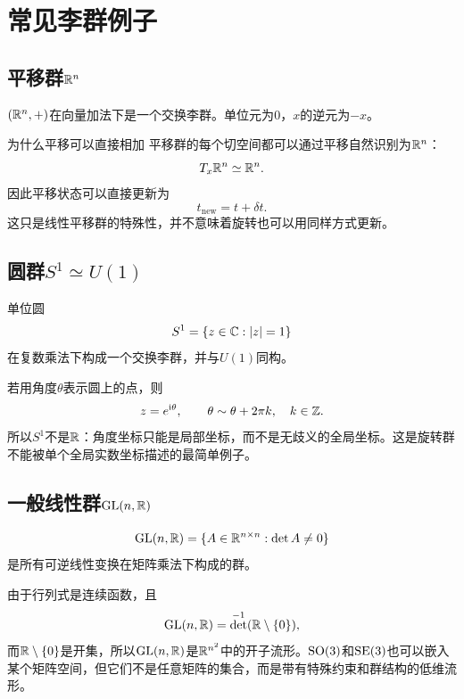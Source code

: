 
\section{常见李群例子}

\subsection{平移群$\mathbb{R}^n$}

\begin{definition}[平移李群]
$(\mathbb{R}^n,+)$在向量加法下是一个交换李群。单位元为$0$，$x$的逆元为$-x$。
\end{definition}

\begin{lieexample}{为什么平移可以直接相加}
平移群的每个切空间都可以通过平移自然识别为$\mathbb{R}^n$：
\[
    T_x\mathbb{R}^n\simeq\mathbb{R}^n.
\]
因此平移状态可以直接更新为
\[
    t_{\mathrm{new}}=t+\delta t.
\]
这只是线性平移群的特殊性，并不意味着旋转也可以用同样方式更新。
\end{lieexample}

\subsection{圆群$S^1\simeq U(1)$}

\begin{definition}[圆群]
单位圆
\[
    S^1=\{z\in\mathbb{C}:|z|=1\}
\]
在复数乘法下构成一个交换李群，并与$U(1)$同构。
\end{definition}

若用角度$\theta$表示圆上的点，则
\[
    z=e^{\mathrm i\theta},
    \qquad
    \theta\sim\theta+2\pi k,\quad k\in\mathbb{Z}.
\]
所以$S^1$不是$\mathbb{R}$：角度坐标只能是局部坐标，而不是无歧义的全局坐标。这是旋转群不能被单个全局实数坐标描述的最简单例子。

\subsection{一般线性群$\mathrm{GL}(n,\mathbb{R})$}

\begin{definition}[一般线性群]
\[
    \mathrm{GL}(n,\mathbb{R})
    =\{A\in\mathbb{R}^{n\times n}:\det A\neq0\}
\]
是所有可逆线性变换在矩阵乘法下构成的群。
\end{definition}

由于行列式是连续函数，且
\[
    \mathrm{GL}(n,\mathbb{R})
    =\det^{-1}(\mathbb{R}\setminus\{0\}),
\]
而$\mathbb{R}\setminus\{0\}$是开集，所以$\mathrm{GL}(n,\mathbb{R})$是$\mathbb{R}^{n^2}$中的开子流形。$\operatorname{SO}(3)$和$\operatorname{SE}(3)$也可以嵌入某个矩阵空间，但它们不是任意矩阵的集合，而是带有特殊约束和群结构的低维流形。

